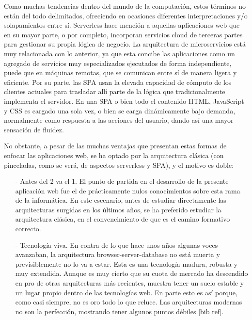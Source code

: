 \documentclass[a4paper]{article}
\begin{document}
    Como muchas tendencias dentro del mundo de la computación, estos términos no están del todo delimitados, ofreciendo en ocasiones diferentes interpretaciones y/o solapamientos entre sí. Serverless hace mención a aquellas aplicaciones web que en su mayor parte, o por completo, incorporan servicios cloud de terceras partes para gestionar su propia lógica de negocio. La arquitectura de microservicios está muy relacionada con lo anterior, ya que esta concibe las aplicaciones como un agregado de servicios muy especializados ejecutados de forma independiente, puede que en máquinas remotas, que se comunican entre sí de manera ligera y eficiente. Por su parte, las SPA usan la elevada capacidad de cómputo de los clientes actuales para trasladar allí parte de la lógica que tradicionalmente implementa el servidor. En una SPA o bien todo el contenido HTML, JavaScript y CSS es cargado una sola vez, o bien se carga dinámicamente bajo demanda, normalmente como respuesta a las acciones del usuario, dando así una mayor sensación de fluidez.
    
    No obstante, a pesar de las muchas ventajas que presentan estas formas de enfocar las aplicaciones web, se ha optado por la arquitectura clásica (con pinceladas, como se verá, de aspectos serverless y SPA), y el motivo es doble:
    
    \begin{itemize}
    	\item[-] Antes del 2 va el 1. El punto de partida en el desarrollo de la presente aplicación web fue el de prácticamente nulos conocimientos sobre esta rama de la informática. En este escenario, antes de estudiar directamente las arquitecturas surgidas en los últimos años, se ha preferido estudiar la arquitectura clásica, en el convencimiento de que es el camino formativo correcto.
    	\item[-] Tecnología viva. En contra de lo que hace unos años algunas voces avanzaban, la arquitectura browser-server-database no está muerta y previsiblemente no lo va a estar. Esta es una tecnología madura, robusta y muy extendida. Aunque es muy cierto que su cuota de mercado ha descendido en pro de otras arquitecturas más recientes, muestra tener un suelo estable y un lugar propio dentro de las tecnologías web. En parte esto es así porque, como casi siempre, no es oro todo lo que reluce. Las arquitecturas modernas no son la perfección, mostrando tener algunos puntos débiles [bib ref].
    \end{itemize}
    
\end{document}
